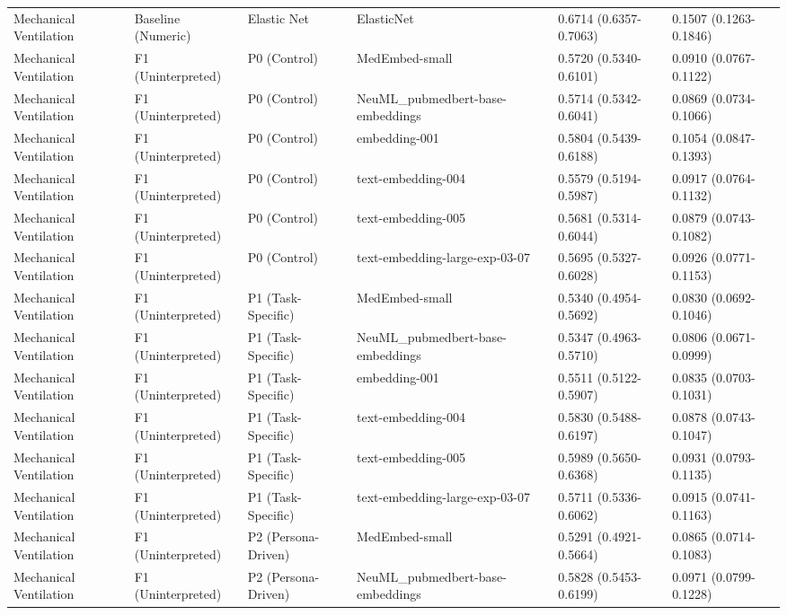 \documentclass[border=0pt]{standalone}
\begin{document}
\begin{adjustbox}{width=\textwidth}
\begin{tabular}{llllll}
Mechanical Ventilation & Baseline (Numeric) & Elastic Net & ElasticNet & 0.6714 (0.6357-0.7063) & 0.1507 (0.1263-0.1846) \\
Mechanical Ventilation & F1 (Uninterpreted) & P0 (Control) & MedEmbed-small & 0.5720 (0.5340-0.6101) & 0.0910 (0.0767-0.1122) \\
Mechanical Ventilation & F1 (Uninterpreted) & P0 (Control) & NeuML\_pubmedbert-base-embeddings & 0.5714 (0.5342-0.6041) & 0.0869 (0.0734-0.1066) \\
Mechanical Ventilation & F1 (Uninterpreted) & P0 (Control) & embedding-001 & 0.5804 (0.5439-0.6188) & 0.1054 (0.0847-0.1393) \\
Mechanical Ventilation & F1 (Uninterpreted) & P0 (Control) & text-embedding-004 & 0.5579 (0.5194-0.5987) & 0.0917 (0.0764-0.1132) \\
Mechanical Ventilation & F1 (Uninterpreted) & P0 (Control) & text-embedding-005 & 0.5681 (0.5314-0.6044) & 0.0879 (0.0743-0.1082) \\
Mechanical Ventilation & F1 (Uninterpreted) & P0 (Control) & text-embedding-large-exp-03-07 & 0.5695 (0.5327-0.6028) & 0.0926 (0.0771-0.1153) \\
Mechanical Ventilation & F1 (Uninterpreted) & P1 (Task-Specific) & MedEmbed-small & 0.5340 (0.4954-0.5692) & 0.0830 (0.0692-0.1046) \\
Mechanical Ventilation & F1 (Uninterpreted) & P1 (Task-Specific) & NeuML\_pubmedbert-base-embeddings & 0.5347 (0.4963-0.5710) & 0.0806 (0.0671-0.0999) \\
Mechanical Ventilation & F1 (Uninterpreted) & P1 (Task-Specific) & embedding-001 & 0.5511 (0.5122-0.5907) & 0.0835 (0.0703-0.1031) \\
Mechanical Ventilation & F1 (Uninterpreted) & P1 (Task-Specific) & text-embedding-004 & 0.5830 (0.5488-0.6197) & 0.0878 (0.0743-0.1047) \\
Mechanical Ventilation & F1 (Uninterpreted) & P1 (Task-Specific) & text-embedding-005 & 0.5989 (0.5650-0.6368) & 0.0931 (0.0793-0.1135) \\
Mechanical Ventilation & F1 (Uninterpreted) & P1 (Task-Specific) & text-embedding-large-exp-03-07 & 0.5711 (0.5336-0.6062) & 0.0915 (0.0741-0.1163) \\
Mechanical Ventilation & F1 (Uninterpreted) & P2 (Persona-Driven) & MedEmbed-small & 0.5291 (0.4921-0.5664) & 0.0865 (0.0714-0.1083) \\
Mechanical Ventilation & F1 (Uninterpreted) & P2 (Persona-Driven) & NeuML\_pubmedbert-base-embeddings & 0.5828 (0.5453-0.6199) & 0.0971 (0.0799-0.1228) \\

\end{tabular}
\end{adjustbox}
\end{document}
